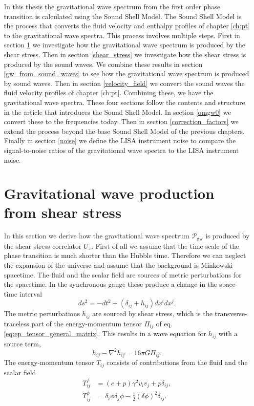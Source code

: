 In this thesis the gravitational wave spectrum from the first order phase transition is calculated using the Sound Shell Model.
The Sound Shell Model is the process that converts the fluid velocity and enthalpy profiles of chapter \ref{ch:pt} to the gravitational wave spectra.
This process involves multiple steps.
First in section \ref{gw_production} we investigate how the gravitational wave spectrum is produced by the shear stress.
Then in section \ref{shear_stress} we investigate how the shear stress is produced by the sound waves.
We combine these results in section \ref{gw_from_sound_waves} to see how the gravitational wave spectrum is produced by sound waves.
Then in section \ref{velocity_field} we convert the sound waves the fluid velocity profiles of chapter \ref{ch:pt}.
Combining these, we have the gravitational wave spectra.
These four sections follow the contents and structure in the article \cite{hindmarsh_gw_pt_2019} that introduces the Sound Shell Model.
In section \ref{omgw0} we convert these to the frequencies today.
Then in section \ref{correction_factors} we extend the process beyond the base Sound Shell Model of the previous chapters.
Finally in section \ref{noise} we define the LISA instrument noise to compare the signal-to-noise ratios of the gravitational wave spectra to the LISA instrument noise.


\section{Gravitational wave production from shear stress}
\label{gw_production}
In this section we derive how the gravitational wave spectrum $\mathcal{P}_\text{gw}$ is produced by the shear stress correlator $U_\pi$.
First of all we assume that the time scale of the phase transition is much shorter than the Hubble time.
Therefore we can neglect the expansion of the universe and assume that the background is Minkowski spacetime.
The fluid and the scalar field are sources of metric perturbations for the spacetime.
In the synchronous gauge these produce a change in the space-time interval
\cite[p. 7]{hindmarsh_gw_pt_2019}
\begin{equation}
ds^2 = -dt^2 + (\delta_{ij} + h_{ij}) dx^i dx^j.
\end{equation}
The metric perturbations $h_{ij}$ are sourced by shear stress,
which is the transverse-traceless part of the energy-momentum tensor $\Pi_{ij}$ of eq. \eqref{eq:ep_tensor_general_matrix}.
This results in a wave equation for $h_{ij}$ with a source term,
\cites[eq. 3.1]{hindmarsh_gw_pt_2019}[eq. 1.24]{maggiore_gw_2008}
\begin{equation}
\ddot{h}_{ij} - \nabla^2 h_{ij} = 16 \pi G \Pi_{ij}.
\end{equation}
The energy-momentum tensor $T_{ij}$ consists of contributions from the fluid and the scalar field \cite[p. 7]{hindmarsh_gw_pt_2019}
\begin{align}
T^f_{ij}    &= (e+p) \gamma^2 v_i v_j + p \delta_{ij}, \\
T^\phi_{ij} &= \delta_i \phi \delta_j \phi - \frac{1}{2}(\delta \phi)^2 \delta_{ij}.
\end{align}

